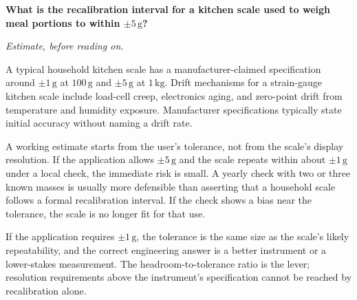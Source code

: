 \begin{estimation}
\textbf{What is the recalibration interval for a kitchen scale
used to weigh meal portions to within $\pm 5 \,\si{\gram}$?}

\smallskip
\textit{Estimate, before reading on.}

\smallskip
A typical household kitchen scale has a manufacturer-claimed
specification around $\pm 1 \,\si{\gram}$ at $100 \,\si{\gram}$ and
$\pm 5 \,\si{\gram}$ at $1 \,\si{\kilogram}$. Drift mechanisms for a
strain-gauge kitchen scale include load-cell creep, electronics
aging, and zero-point drift from temperature and humidity exposure.
Manufacturer specifications typically state initial accuracy without
naming a drift rate.

A working estimate starts from the user's tolerance, not from the
scale's display resolution. If the application allows
$\pm 5 \,\si{\gram}$ and the scale repeats within about
$\pm 1 \,\si{\gram}$ under a local check, the immediate risk is
small. A yearly check with two or three known masses is usually
more defensible than asserting that a household scale follows a
formal recalibration interval. If the check shows a bias near the
tolerance, the scale is no longer fit for that use.

If the application requires $\pm 1 \,\si{\gram}$, the tolerance is
the same size as the scale's likely repeatability, and the correct
engineering answer is a better instrument or a lower-stakes
measurement. The headroom-to-tolerance ratio is the lever;
resolution requirements above the instrument's specification cannot
be reached by recalibration alone.
\end{estimation}



